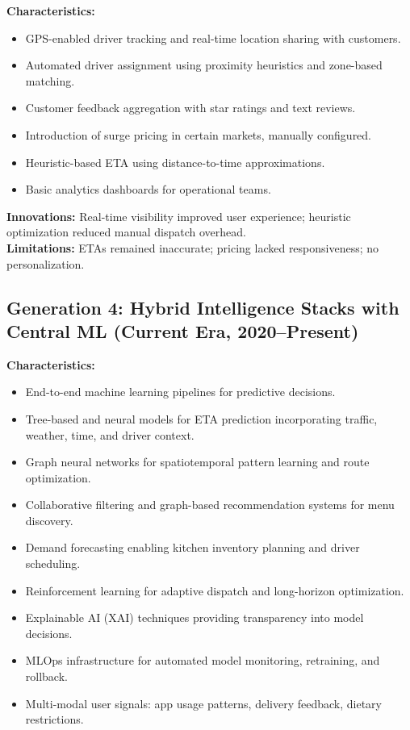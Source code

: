 \documentclass[12pt,a4paper]{report}
\begin{document}
\textbf{Characteristics:}
\begin{itemize}
    \item GPS-enabled driver tracking and real-time location sharing with customers.
    \item Automated driver assignment using proximity heuristics and zone-based matching.
    \item Customer feedback aggregation with star ratings and text reviews.
    \item Introduction of surge pricing in certain markets, manually configured.
    \item Heuristic-based ETA using distance-to-time approximations.
    \item Basic analytics dashboards for operational teams.
\end{itemize}

\textbf{Innovations:} Real-time visibility improved user experience; heuristic optimization reduced manual dispatch overhead. \\
\textbf{Limitations:} ETAs remained inaccurate; pricing lacked responsiveness; no personalization.

\subsection{Generation 4: Hybrid Intelligence Stacks with Central ML (Current Era, 2020--Present)}

\textbf{Characteristics:}
\begin{itemize}
    \item End-to-end machine learning pipelines for predictive decisions.
    \item Tree-based and neural models for ETA prediction incorporating traffic, weather, time, and driver context.
    \item Graph neural networks for spatiotemporal pattern learning and route optimization.
    \item Collaborative filtering and graph-based recommendation systems for menu discovery.
    \item Demand forecasting enabling kitchen inventory planning and driver scheduling.
    \item Reinforcement learning for adaptive dispatch and long-horizon optimization.
    \item Explainable AI (XAI) techniques providing transparency into model decisions.
    \item MLOps infrastructure for automated model monitoring, retraining, and rollback.
    \item Multi-modal user signals: app usage patterns, delivery feedback, dietary restrictions.
\end{itemize}
\end{document}
